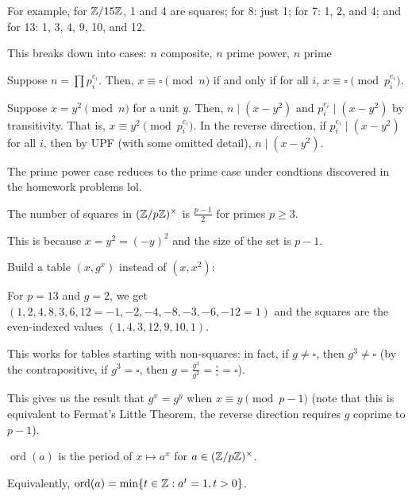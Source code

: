 \documentclass[notes]{agony}
\newcommand{\ord}{\operatorname{ord}}
\begin{document}
For example, for $\mathbb{Z}/15\mathbb{Z}$, 1 and 4 are squares;
for 8: just 1; for 7: 1, 2, and 4; and for 13: 1, 3, 4, 9, 10, and 12.

This breaks down into cases: $n$ composite, $n$ prime power, $n$ prime

\begin{theorem}
    Suppose $n = \prod p_i^{e_i}$.
    Then, $x \equiv \square \pmod n$ if and only if for all $i$,
    $x \equiv \square \pmod{p_i^{e_i}}$.
\end{theorem}
\begin{prf}
    Suppose $x = y^2 \pmod n$ for a unit $y$.
    Then, $n \mid (x - y^2)$ and $p_i^{e_i} \mid (x-y^2)$ by transitivity.
    That is, $x \equiv y^2 \pmod {p_i^{e_i}}$.
    In the reverse direction, if $p_i^{e_i} \mid (x - y^2)$ for all $i$,
    then by UPF (with some omitted detail), $n \mid (x-y^2)$.
\end{prf}

The prime power case reduces to the prime case
under condtions discovered in the homework problems lol.

\begin{theorem}
    The number of squares in $(\mathbb{Z}/p\mathbb{Z})^\times$
    is $\frac{p-1}{2}$ for primes $p \geq 3$.
\end{theorem}
\begin{prf}
    This is because $x = y^2 = (-y)^2$ and the size of the set is $p-1$.

    Build a table $(x,g^x)$ instead of $(x,x^2)$:

    For $p=13$ and $g=2$, we get $(1,2,4,8,3,6,12=-1,-2,-4,-8,-3,-6,-12=1)$
    and the squares are the even-indexed values $(1,4,3,12,9,10,1)$.

    This works for tables starting with non-squares:
    in fact, if $g \neq \square$, then $g^3 \neq \square$
    (by the contrapositive, if $g^3 = \square$,
    then $g = \frac{g^3}{g^2} = \frac{\square}{\square} = \square$).

    This gives us the result that $g^x = g^y$ when $x \equiv y \pmod{p-1}$
    (note that this is equivalent to Fermat's Little Theorem,
    the reverse direction requires $g$ coprime to $p-1$).
\end{prf}

\begin{defn}[order]
    $\ord(a)$ is the period of $x \mapsto a^x$ for $a \in (\mathbb{Z}/p\mathbb{Z})^\times$.

    Equivalently, $\ord(a) = \min\{t \in \Z : a^t = 1, t > 0\}$.
\end{defn}
\end{document}
